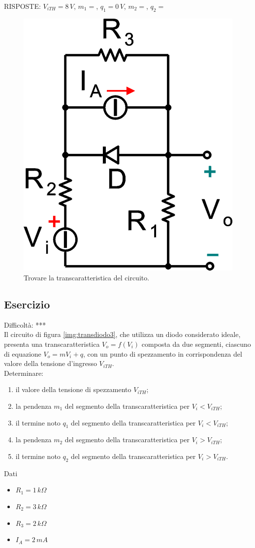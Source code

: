 \documentclass[a4paper,portrait,12pt]{article}
\theoremstyle{definition}
\begin{document}
RISPOSTE: $V_{iTH} = 8\,V$, $m_1 = $, $q_1 = 0\,V$, $m_2 = $, $q_2 = $

\begin{figure}[H]
\centering
\includegraphics[width=.3\linewidth]{img/elettronicaEs/transdiodo2.pdf}
\caption{Trovare la transcaratteristica del circuito.}
\label{img:transdiodo2}
\end{figure}


\subsection{Esercizio}
 
Difficoltà: ***\\
 
Il circuito di figura \ref{img:transdiodo3}, che utilizza un diodo considerato ideale, presenta una
transcaratteristica $V_o = f(V_i)$ composta da due segmenti, ciascuno di equazione $V_o=m V_i+q$, con un
punto di spezzamento in corrispondenza del valore della tensione d'ingresso $V_{iTH}$.\\

Determinare:
\begin{enumerate}
\item il valore della tensione di spezzamento $V_{iTH}$;
\item la pendenza $m_1$ del segmento della transcaratteristica per $V_i < V_{iTH}$;
\item il termine noto $q_1$ del segmento della transcaratteristica per $V_i < V_{iTH}$;
\item la pendenza $m_2$ del segmento della transcaratteristica per $V_i > V_{iTH}$;
\item il termine noto $q_2$ del segmento della transcaratteristica per $V_i > V_{iTH}$.
\end{enumerate}

Dati
\begin{itemize}
\item $R_1=1\,k\Omega$ 
\item $R_2=3\,k\Omega$ 
\item $R_3=2\,k\Omega$ 
\item $I_A=2\,mA$
\end{itemize}
\end{document}
